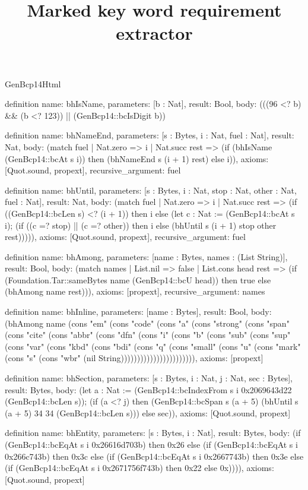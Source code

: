 \begin{lexlean}{GenBcp14Html}
\title{Marked key word requirement extractor}
\begin{semanticmodule}
definition{
  name: bhIsName,
  parameters: [b : Nat],
  result: Bool,
  body: (((96 <? b) && (b <? 123)) || (GenBcp14::bcIsDigit b))
}

definition{
  name: bhNameEnd,
  parameters: [s : Bytes, i : Nat, fuel : Nat],
  result: Nat,
  body: (match fuel
    | Nat.zero => i
    | Nat.succ rest => (if (bhIsName (GenBcp14::bcAt s i)) then (bhNameEnd s (i + 1) rest) else i)),
  axioms: [Quot.sound, propext],
  recursive_argument: fuel
}

definition{
  name: bhUntil,
  parameters: [s : Bytes, i : Nat, stop : Nat, other : Nat, fuel : Nat],
  result: Nat,
  body: (match fuel
    | Nat.zero => i
    | Nat.succ rest => (if ((GenBcp14::bcLen s) <? (i + 1)) then i else (let c : Nat := (GenBcp14::bcAt s i); (if ((c =? stop) || (c =? other)) then i else (bhUntil s (i + 1) stop other rest))))),
  axioms: [Quot.sound, propext],
  recursive_argument: fuel
}

definition{
  name: bhAmong,
  parameters: [name : Bytes, names : (List String)],
  result: Bool,
  body: (match names
    | List.nil => false
    | List.cons head rest => (if (Foundation.Tar::sameBytes name (GenBcp14::bcU head)) then true else (bhAmong name rest))),
  axioms: [propext],
  recursive_argument: names
}

definition{
  name: bhInline,
  parameters: [name : Bytes],
  result: Bool,
  body: (bhAmong name (cons "em" (cons "code" (cons "a" (cons "strong" (cons "span" (cons "cite" (cons "abbr" (cons "dfn" (cons "i" (cons "b" (cons "sub" (cons "sup" (cons "var" (cons "kbd" (cons "bdi" (cons "q" (cons "small" (cons "u" (cons "mark" (cons "s" (cons "wbr" (nil String))))))))))))))))))))))),
  axioms: [propext]
}

definition{
  name: bhSection,
  parameters: [s : Bytes, i : Nat, j : Nat, sec : Bytes],
  result: Bytes,
  body: (let a : Nat := (GenBcp14::bcIndexFrom s i 0x2069643d22 (GenBcp14::bcLen s)); (if (a <? j) then (GenBcp14::bcSpan s (a + 5) (bhUntil s (a + 5) 34 34 (GenBcp14::bcLen s))) else sec)),
  axioms: [Quot.sound, propext]
}

definition{
  name: bhEntity,
  parameters: [s : Bytes, i : Nat],
  result: Bytes,
  body: (if (GenBcp14::bcEqAt s i 0x26616d703b) then 0x26 else (if (GenBcp14::bcEqAt s i 0x266c743b) then 0x3c else (if (GenBcp14::bcEqAt s i 0x2667743b) then 0x3e else (if (GenBcp14::bcEqAt s i 0x2671756f743b) then 0x22 else 0x)))),
  axioms: [Quot.sound, propext]
}


\end{semanticmodule}
\end{lexlean}
